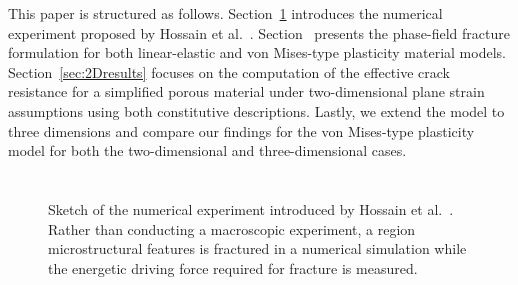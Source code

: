 \documentclass[pdflatex,sn-mathphys-num]{sn-jnl}%
\theoremstyle{thmstyleone}%
\theoremstyle{thmstyletwo}%
\theoremstyle{thmstylethree}%
\begin{document}
This paper is structured as follows.
Section~\ref{sec:numericalExperiment} introduces the numerical experiment
proposed by Hossain et al.~\cite{hossain_effective_2014}.
Section~\replaced{\ref{sec:simulation_phase_field_models}}{\ref{sec:phase_fiel_model_ductile}} presents the phase-field
fracture formulation for both linear-elastic and von Mises-type plasticity material models.
Section~\ref{sec:2Dresults} focuses on the computation
of the effective crack resistance for a simplified porous material
under two-dimensional plane strain assumptions
 using both constitutive descriptions.
Lastly, we extend the model to three dimensions and compare our findings for the von Mises-type plasticity model
for both the two-dimensional and three-dimensional cases.




\section{\texorpdfstring{}{A Numerical Experiment for the Crack Resistance of a Resolved Porous Region}}
\label{sec:numericalExperiment}


\begin{figure}[htb]
    \centering
    \resizebox{0.6\textwidth}{!}{}
    \caption{%
        Sketch of the numerical experiment introduced by Hossain et al.~\cite{hossain_effective_2014}. 
        Rather than conducting a macroscopic experiment, a region  microstructural features is fractured in a numerical simulation while the energetic driving force required for fracture is measured.
    }
    \label{fig:numerical_experiment}
\end{figure}
\end{document}
